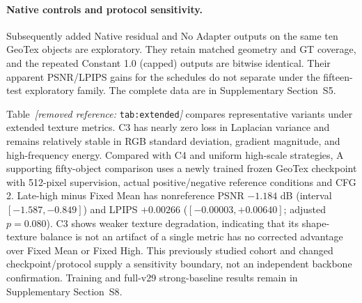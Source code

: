 \documentclass[times,twocolumn,final]{elsarticle}
\providecommand{\DIFadd}[1]{{\protect\color{blue} \sf #1}} %
\providecommand{\DIFdel}[1]{{\protect\color{red} \scriptsize #1}} %
\providecommand{\DIFaddbegin}{} %
\providecommand{\DIFaddend}{} %
\providecommand{\DIFdelbegin}{} %
\providecommand{\DIFdelend}{} %
\begin{document}
\DIFdelend \DIFaddbegin \paragraph{Native controls and protocol sensitivity.}
\DIFadd{Subsequently added Native residual and No Adapter outputs on the same ten GeoTex objects are exploratory. They retain matched geometry and GT coverage, and the repeated Constant 1.0 (capped) outputs are bitwise identical. Their apparent PSNR/LPIPS gains for the schedules do not separate under the fifteen-test exploratory family. The complete data are in Supplementary Section~S5.
}\DIFaddend 

\DIFdelbegin \DIFdel{Table~\textit{[removed reference: }\texttt{tab:extended}\textit{]} compares representative variants under extended texture metrics. C3 has nearly zero loss in Laplacian variance and remains relatively stable in RGB standard deviation, gradient magnitude, and high-frequency energy. Compared with C4 and uniform high-scale strategies, }\DIFdelend \DIFaddbegin \DIFadd{A supporting fifty-object comparison uses a newly trained frozen GeoTex checkpoint with 512-pixel supervision, actual positive/negative reference conditions and CFG 2. Late-high minus Fixed Mean has nonreference PSNR $-1.184$ dB (interval $[-1.587,-0.849]$) and LPIPS $+0.00266$ ($[-0.00003,+0.00640]$; adjusted $p=0.080$). }\DIFaddend C3 \DIFdelbegin \DIFdel{shows weaker texture degradation, indicating that its shape-texture balance is not an artifact of a single metric}\DIFdelend \DIFaddbegin \DIFadd{has no corrected advantage over Fixed Mean or Fixed High. This previously studied cohort and changed checkpoint/protocol supply a sensitivity boundary, not an independent backbone confirmation. Training and full-v29 strong-baseline results remain in Supplementary Section~S8}\DIFaddend .
\end{document}
